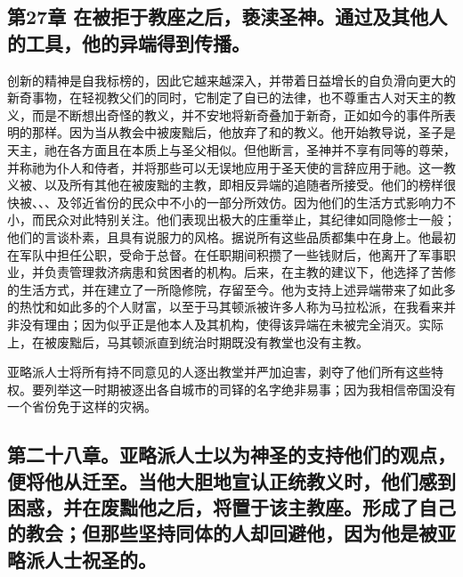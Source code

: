 \subsection{第27章 在被拒于教座之后，亵渎圣神。通过及其他人的工具，他的异端得到传播。}

创新的精神是自我标榜的，因此它越来越深入，并带着日益增长的自负滑向更大的新奇事物，在轻视教父们的同时，它制定了自已的法律，也不尊重古人对天主的教义，而是不断想出奇怪的教义，并不安地将新奇叠加于新奇，正如如今的事件所表明的那样。因为当从教会中被废黜后，他放弃了和的教义。他开始教导说，圣子是天主，祂在各方面且在本质上与圣父相似。但他断言，圣神并不享有同等的尊荣，并称祂为仆人和侍者，并将那些可以无误地应用于圣天使的言辞应用于祂。这一教义被、以及所有其他在被废黜的主教，即相反异端的追随者所接受。他们的榜样很快被、、、及邻近省份的民众中不小的一部分所效仿。因为他们的生活方式影响力不小，而民众对此特别关注。他们表现出极大的庄重举止，其纪律如同隐修士一般；他们的言谈朴素，且具有说服力的风格。据说所有这些品质都集中在身上。他最初在军队中担任公职，受命于总督。在任职期间积攒了一些钱财后，他离开了军事职业，并负责管理救济病患和贫困者的机构。后来，在主教的建议下，他选择了苦修的生活方式，并在建立了一所隐修院，存留至今。他为支持上述异端带来了如此多的热忱和如此多的个人财富，以至于马其顿派被许多人称为马拉松派，在我看来并非没有理由；因为似乎正是他本人及其机构，使得该异端在未被完全消灭。实际上，在被废黜后，马其顿派直到统治时期既没有教堂也没有主教。\par

亚略派人士将所有持不同意见的人逐出教堂并严加迫害，剥夺了他们所有这些特权。要列举这一时期被逐出各自城巿的司铎的名字绝非易事；因为我相信帝国没有一个省份免于这样的灾祸。\par


\subsection{第二十八章。亚略派人士以为神圣的支持他们的观点，便将他从迁至。当他大胆地宣认正统教义时，他们感到困惑，并在废黜他之后，将置于该主教座。形成了自己的教会；但那些坚持同体的人却回避他，因为他是被亚略派人士祝圣的。}

